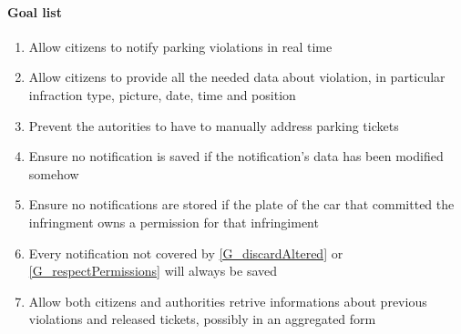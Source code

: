 \documentclass{article}
\newcommand{\enum}[1]{\texttt{#1.\arabic*}}
\begin{document}
\paragraph{Goal list}
\begin{enumerate}[label=\enum{G}]
	\item  Allow citizens to notify parking violations in real time
	\item \label{G_allData}Allow citizens to provide all the needed data about violation, in particular infraction type, picture, date, time and position
	\item Prevent the autorities to have to manually address parking tickets
	\item \label{G_discardAltered} Ensure no notification is saved if the notification's data has been modified somehow
	\item \label{G_respectPermissions} Ensure no notifications are stored if the plate of the car that committed the infringment owns a permission for that infringiment
	\item \label{G_storeFine} Every notification not covered by \ref{G_discardAltered} or \ref{G_respectPermissions} will always be saved
	\item \label{G_statistics}Allow both citizens and authorities retrive informations about previous violations and released tickets, possibly in an aggregated form 
\end{enumerate}
\end{document}
